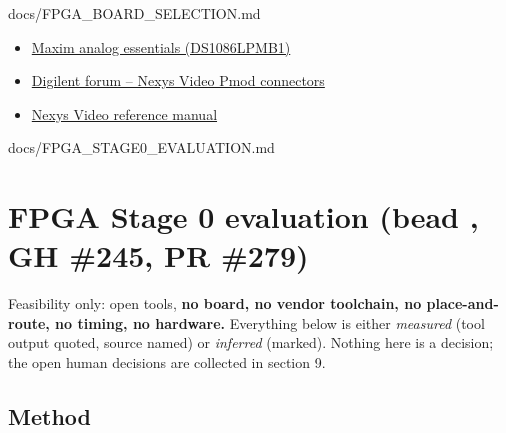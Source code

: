 \begin{relocated}{docs/FPGA_BOARD_SELECTION.md}
\begin{itemize}
{  Electronics -- Adafruit 2045}
\item
  \href{https://wcm-cce.cldnet.analog.com/media/en/news-marketing-collateral/solutions-bulletins-brochures/maxim-analog-essentials-collection.pdf}{Maxim
  analog essentials (DS1086LPMB1)}
\item
  \href{https://forum.digilent.com/topic/17773-nexys-video-pmod-connectors/}{Digilent
  forum -- Nexys Video Pmod connectors}
\item
  \href{https://reference.digilentinc.com/programmable-logic/nexys-video/reference-manual}{Nexys
  Video reference manual}
\end{itemize}
\end{relocated}

\begin{relocated}{docs/FPGA_STAGE0_EVALUATION.md}
\section{\texorpdfstring{FPGA Stage 0 evaluation (bead , GH
\#245, PR \#279)}{FPGA Stage 0 evaluation (bead , GH \#245, PR \#279)}}\label{tm:dec:fpga-stage0-evaluation}

Feasibility only: open tools, \textbf{no board, no vendor toolchain, no
place-and-route, no timing, no hardware.} Everything below is either
\emph{measured} (tool output quoted, source named) or \emph{inferred}
(marked). Nothing here is a decision; the open human decisions are
collected in section 9.

\subsection{Method}\label{tm:dec:fpga-stage0-evaluation:1-method}


\end{relocated}
